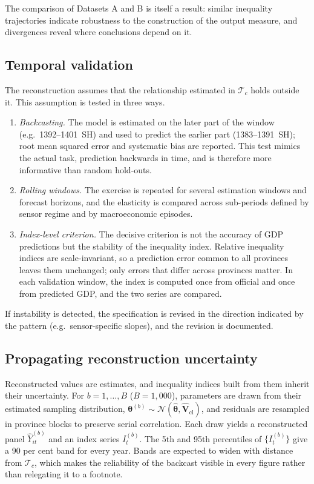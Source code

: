 \documentclass[11pt,a4paper]{article}
\begin{document}
The comparison of Datasets A and B is itself a result: similar inequality trajectories indicate robustness to the construction of the output measure, and divergences reveal where conclusions depend on it.

\subsection{Temporal validation}\label{sec:validation}

The reconstruction assumes that the relationship estimated in $\mathcal{T}_c$ holds outside it. This assumption is tested in three ways.
\begin{enumerate}[label=(\roman*)]
\item \emph{Backcasting.} The model is estimated on the later part of the window (e.g.\ 1392--1401~SH) and used to predict the earlier part (1383--1391~SH); root mean squared error and systematic bias are reported. This test mimics the actual task, prediction backwards in time, and is therefore more informative than random hold-outs.
\item \emph{Rolling windows.} The exercise is repeated for several estimation windows and forecast horizons, and the elasticity is compared across sub-periods defined by sensor regime and by macroeconomic episodes.
\item \emph{Index-level criterion.} The decisive criterion is not the accuracy of GDP predictions but the stability of the inequality index. Relative inequality indices are scale-invariant, so a prediction error common to all provinces leaves them unchanged; only errors that differ across provinces matter. In each validation window, the index is computed once from official and once from predicted GDP, and the two series are compared.
\end{enumerate}
If instability is detected, the specification is revised in the direction indicated by the pattern (e.g.\ sensor-specific slopes), and the revision is documented.

\subsection{Propagating reconstruction uncertainty}\label{sec:uncertainty}

Reconstructed values are estimates, and inequality indices built from them inherit their uncertainty. For $b=1,\ldots,B$ ($B=1{,}000$), parameters are drawn from their estimated sampling distribution, $\bm\theta^{(b)}\sim\mathcal{N}(\hat{\bm\theta},\hat{\bm V}_{\text{cl}})$, and residuals are resampled in province blocks to preserve serial correlation. Each draw yields a reconstructed panel $\widehat Y^{(b)}_{it}$ and an index series $I^{(b)}_t$. The 5th and 95th percentiles of $\{I^{(b)}_t\}$ give a 90 per cent band for every year. Bands are expected to widen with distance from $\mathcal{T}_c$, which makes the reliability of the backcast visible in every figure rather than relegating it to a footnote.
\end{document}
